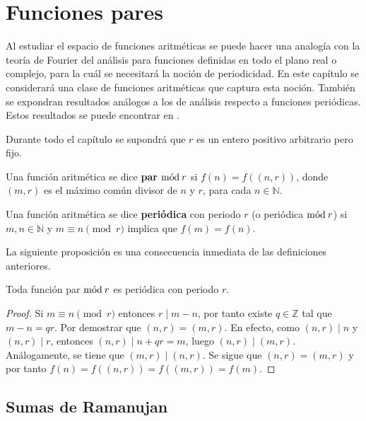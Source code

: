 \newpage
\section{Funciones pares}

Al estudiar el espacio de funciones aritméticas se puede hacer una analogía con la teoría de Fourier del análisis para funciones definidas en todo el plano real o complejo, para la cuál se necesitará la noción de periodicidad. En este capítulo se considerará una clase de funciones aritméticas que captura esta noción. También se expondran resultados análogos a los de análisis respecto a funciones periódicas. Estos resultados se puede encontrar en \cite{Coh1}.

\begin{remark}
Durante todo el capítulo se supondrá que $r$ es un entero positivo arbitrario pero fijo.
\end{remark}

\begin{definition}
Una función aritmética se dice \textbf{par} $\mathrm{m\acute{o}d\:}r$ si $f(n)=f((n,r))$, donde $(m,r)$ es el máximo común divisor de $n$ y $r$, para cada $n \in \mathbb{N}$.
\end{definition}

\begin{definition}
Una función aritmética se dice \textbf{periódica} con periodo $r$ (o periódica $\mathrm{m\acute{o}d\:}r$) si $m, n \in \mathbb{N}$ y $m \equiv n \pmod{r}$ implica que $f(m)=f(n)$.
\end{definition}

La siguiente proposición es una consecuencia inmediata de las definiciones anteriores.

\begin{proposition}
Toda función par $\mathrm{m\acute{o}d\:}r$ es periódica con periodo $r$.
\end{proposition}
\begin{proof}
Si $m \equiv n \pmod{r}$ entonces $r \mid m-n$, por tanto existe $q \in \mathbb{Z}$ tal que $m-n=q r$. Por demostrar que $(n,r)=(m,r)$. En efecto, como $(n,r) \mid n$ y $(n,r) \mid r$, entonces $(n,r) \mid n+qr=m$, luego $(n,r) \mid (m,r)$. Análogamente, se tiene que $(m,r) \mid (n,r)$. Se sigue que $(n,r)=(m,r)$ y por tanto $f(n)=f((n,r))=f((m,r))=f(m)$.
\end{proof}

\subsection{Sumas de Ramanujan}

